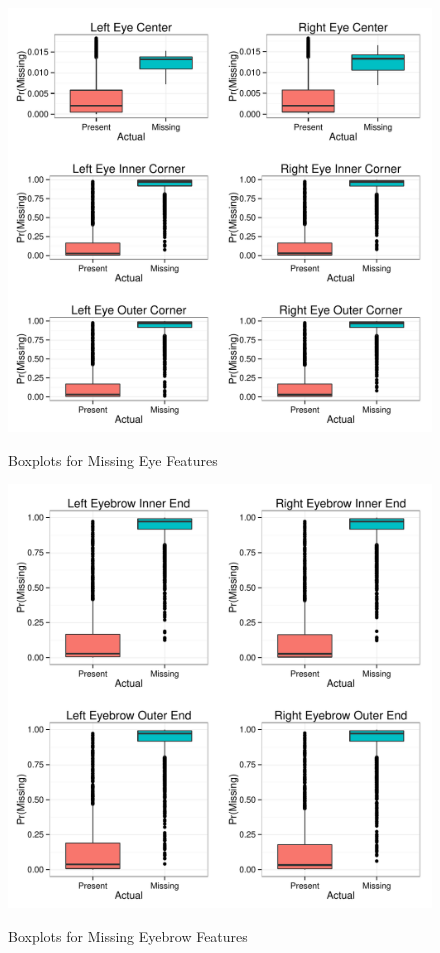 \documentclass[journal]{IEEEtran}
\begin{document}
\begin{figure}[!ht]
  \centering
  \caption{Boxplots for Missing Eye Features}
  \includegraphics[scale=.5]{logistic_boxplots_eye.pdf}
  \label{fig:logistic_boxplots_eye}
\end{figure}

\begin{figure}[!ht]
  \centering
  \caption{Boxplots for Missing Eyebrow Features}
  \includegraphics[scale=.5]{logistic_boxplots_eyebrow.pdf}
  \label{fig:logistic_boxplots_eyebrow}
\end{figure}
\end{document}
